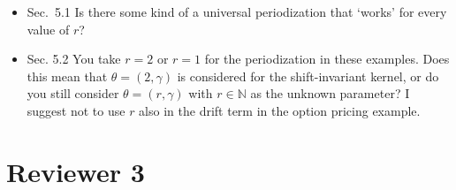 \documentclass{amsart}
\begin{document}
\begin{itemize}
\item Sec.\ 5.1 Is there some kind of a universal periodization that ‘works’ for every value of $r$?

\item Sec. 5.2 You take $r = 2$ or $r = 1$ for the periodization in these examples. Does this mean that $\theta = (2,\gamma)$ is considered for the shift-invariant kernel, or do you still consider $\theta = (r,\gamma)$ with $r \in \mathbb{N}$ as the unknown parameter?
I suggest not to use $r$ also in the drift term in the option pricing example.

\end{itemize}

\section*{Reviewer 3}
\end{document}
